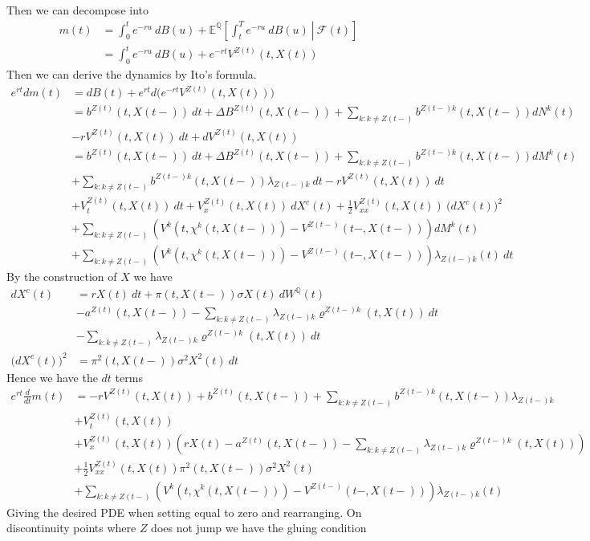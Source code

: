 \documentclass[a4paper,12pt,openany]{book}
\begin{document}
Then we can decompose into
\begin{align*}
m(t)&=\int_0^te^{-ru}\ dB(u)+\mathbb E^{\mathbb Q}\left[\left. \int_t^Te^{-ru}\ dB(u)\ \right\vert\ \mathcal F(t)\right]\\
&=\int_0^te^{-ru}\ dB(u)+e^{-rt}V^{Z(t)}(t,X(t))
\end{align*}
Then we can derive the dynamics by Ito's formula.
\begin{align*}
e^{rt}dm(t)&=dB(t)+e^{rt}d\Big(e^{-rt}V^{Z(t)}(t,X(t))\Big)\\
&=b^{Z(t)}(t,X(t-))\ dt+\Delta B^{Z(t)}(t,X(t-))+\sum_{k:k\ne Z(t-)}b^{Z(t-)k}(t,X(t-))dN^k(t)\\
&-rV^{Z(t)}(t,X(t))\ dt+dV^{Z(t)}(t,X(t))\\
&=b^{Z(t)}(t,X(t-))\ dt+\Delta B^{Z(t)}(t,X(t-))+\sum_{k:k\ne Z(t-)}b^{Z(t-)k}(t,X(t-))dM^k(t)\\
&+\sum_{k:k\ne Z(t-)}b^{Z(t-)k}(t,X(t-))\lambda_{Z(t-)k}\ dt-rV^{Z(t)}(t,X(t))\ dt\\
&+V_t^{Z(t)}(t,X(t))\ dt+V_x^{Z(t)}(t,X(t))\ dX^c(t)+\frac{1}{2}V_{xx}^{Z(t)}(t,X(t))\ \big(dX^c(t)\big)^2\\
&+\sum_{k:k\ne Z(t-)}\left(V^{k}(t,\chi^k(t,X(t-)))-V^{Z(t-)}(t-,X(t-))\right)dM^k(t)\\
&+\sum_{k:k\ne Z(t-)}\left(V^{k}(t,\chi^k(t,X(t-)))-V^{Z(t-)}(t-,X(t-))\right)\lambda_{Z(t-)k}(t)\ dt
\end{align*}
By the construction of \(X\) we have
\begin{align*}
dX^c(t)&=rX(t)\ dt+\pi(t,X(t-))\sigma X(t)\ dW^\mathbb Q(t)\\
&-a^{Z(t)}(t,X(t-))-\sum_{k:k\ne Z(t-)}\lambda_{Z(t-)k}\varrho^{Z(t-)k}(t,X(t))\ dt\\
&-\sum_{k:k\ne Z(t-)}\lambda_{Z(t-)k}\varrho^{Z(t-)k}(t,X(t))\ dt\\
\big(dX^c(t)\big)^2&=\pi^2(t,X(t-))\sigma^2 X^2(t)\ dt
\end{align*}
Hence we have the \(dt\) terms
\begin{align*}
e^{rt}\frac{d}{dt}m(t)&=-rV^{Z(t)}(t,X(t))+b^{Z(t)}(t,X(t-))+\sum_{k:k\ne Z(t-)}b^{Z(t-)k}(t,X(t-))\lambda_{Z(t-)k}\\
&+V_t^{Z(t)}(t,X(t))\\
&+V_x^{Z(t)}(t,X(t))\left(rX(t)-a^{Z(t)}(t,X(t-))-\sum_{k:k\ne Z(t-)}\lambda_{Z(t-)k}\varrho^{Z(t-)k}(t,X(t))\right)\\
&+\frac{1}{2}V_{xx}^{Z(t)}(t,X(t))\pi^2(t,X(t-))\sigma^2 X^2(t)\\
&+\sum_{k:k\ne Z(t-)}\left(V^{k}(t,\chi^k(t,X(t-)))-V^{Z(t-)}(t-,X(t-))\right)\lambda_{Z(t-)k}(t)
\end{align*}
Giving the desired PDE when setting equal to zero and rearranging. On discontinuity points where \(Z\) does not jump we have the gluing condition
\end{document}
